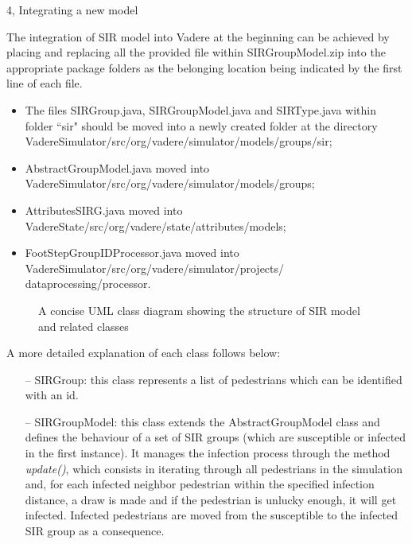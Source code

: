 \documentclass[10pt,a4paper]{article}
\begin{document}
\begin{task}{4, Integrating a new model}


The integration of SIR model into Vadere at the beginning can be achieved by placing and replacing all the provided file within SIRGroupModel.zip into the appropriate package folders as the belonging location being indicated by the first line of each file. 

\begin{itemize}
    \item The files SIRGroup.java, SIRGroupModel.java and SIRType.java within folder ``sir" should be moved into a newly created folder at the directory VadereSimulator/src/org/vadere/simulator/models/groups/sir;
    \item AbstractGroupModel.java moved into VadereSimulator/src/org/vadere/simulator/models/groups;
    \item AttributesSIRG.java moved into VadereState/src/org/vadere/state/attributes/models;
    \item FootStepGroupIDProcessor.java moved into VadereSimulator/src/org/vadere/simulator/projects/ dataprocessing/processor.
\end{itemize}


\begin{figure} [H]
    
    \centering
    \caption{A concise UML class diagram showing the structure of SIR model and related classes}
    \label{diff}
\end{figure}

A more detailed explanation of each class follows below:

\begin{itemize}
\item[--] SIRGroup: this class represents a list of pedestrians which can be identified with an id.

\item[--] SIRGroupModel: this class extends the AbstractGroupModel class and defines the behaviour of a set of SIR groups (which are susceptible or infected in the first instance). It manages the infection process through the method \textit{update()}, which consists in iterating through all pedestrians in the simulation and, for each infected neighbor pedestrian within the specified infection distance, a draw is made and if the pedestrian is unlucky enough, it will get infected. Infected pedestrians are moved from the susceptible to the infected SIR group as a consequence.


\end{itemize}
\end{task}
\end{document}

